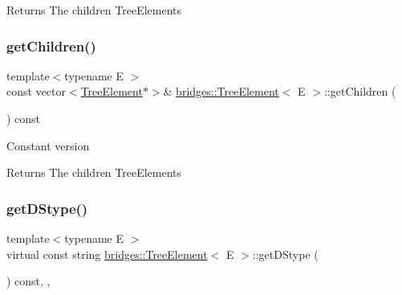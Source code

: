 \begin{DoxyReturn}{Returns}
The children Tree\+Elements 
\end{DoxyReturn}
\mbox{\label{classbridges_1_1_tree_element_a5695c33c22a81a3225fa7b37c2bdf34f}} 
\subsubsection{\texorpdfstring{get\+Children()}{getChildren()}\hspace{0.1cm}{\footnotesize\ttfamily [2/2]}}
{\footnotesize\ttfamily template$<$typename E $>$ \\
const vector$<$\mbox{\hyperlink{classbridges_1_1_tree_element}{Tree\+Element}}$\ast$$>$\& \mbox{\hyperlink{classbridges_1_1_tree_element}{bridges\+::\+Tree\+Element}}$<$ E $>$\+::get\+Children (\begin{DoxyParamCaption}{ }\end{DoxyParamCaption}) const\hspace{0.3cm}{\ttfamily [inline]}}

Constant version

\begin{DoxyReturn}{Returns}
The children Tree\+Elements 
\end{DoxyReturn}
\mbox{\label{classbridges_1_1_tree_element_a6b264d7391442a742edf96bdd5ee5442}} 
\subsubsection{\texorpdfstring{get\+D\+Stype()}{getDStype()}}
{\footnotesize\ttfamily template$<$typename E $>$ \\
virtual const string \mbox{\hyperlink{classbridges_1_1_tree_element}{bridges\+::\+Tree\+Element}}$<$ E $>$\+::get\+D\+Stype (\begin{DoxyParamCaption}{ }\end{DoxyParamCaption}) const\hspace{0.3cm}{\ttfamily [inline]}, {\ttfamily [override]}, {\ttfamily [virtual]}}

